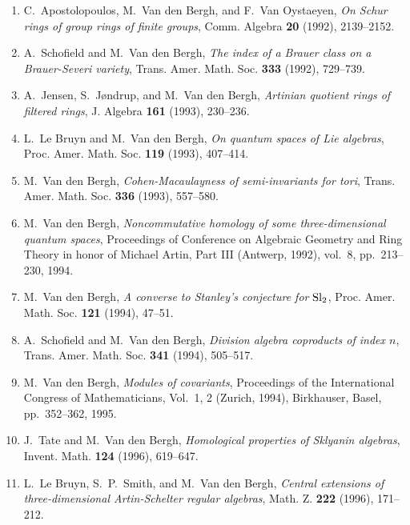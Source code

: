 \begin{enumerate}
\item
C.~Apostolopoulos, M.~Van den Bergh, and F.~Van Oystaeyen, {\em On Schur rings of group rings of finite groups}, Comm. Algebra {\bf 20} (1992), 2139--2152.

\item
A.~Schofield and M.~Van den Bergh, {\em The index of a Brauer class on a Brauer-Severi variety}, Trans. Amer. Math. Soc. {\bf 333} (1992), 729--739.

\item
A.~Jensen, S.~J{\o}ndrup, and M.~Van den Bergh, {\em Artinian quotient rings of filtered rings}, J. Algebra {\bf 161} (1993), 230--236.

\item
L.~Le Bruyn and M.~Van den Bergh, {\em On quantum spaces of Lie algebras}, Proc. Amer. Math. Soc. {\bf 119} (1993), 407--414.

\item
M.~Van den Bergh, {\em Cohen-Macaulayness of semi-invariants for tori}, Trans. Amer. Math. Soc. {\bf 336} (1993), 557--580.

\item
M.~Van den Bergh, {\em Noncommutative homology of some three-dimensional quantum spaces}, Proceedings of Conference on Algebraic Geometry and Ring Theory in honor of Michael Artin, Part III (Antwerp, 1992), vol.~8, pp.~213--230, 1994.

\item
M.~Van den Bergh, {\em A converse to Stanley's conjecture for $\rm Sl\sb 2$}, Proc. Amer. Math. Soc. {\bf 121} (1994), 47--51.

\item
A.~Schofield and M.~Van den Bergh, {\em Division algebra coproducts of index $n$}, Trans. Amer. Math. Soc. {\bf 341} (1994), 505--517.

\item
M.~Van den Bergh, {\em Modules of covariants}, Proceedings of the International Congress of Mathematicians, Vol.\ 1, 2 (Zurich, 1994), Birkhauser, Basel, pp.~352--362, 1995.

\item
J.~Tate and M.~Van den Bergh, {\em Homological properties of Sklyanin algebras}, Invent. Math. {\bf 124} (1996), 619--647.

\item
L.~Le Bruyn, S.~P.~Smith, and M.~Van den Bergh, {\em Central extensions of three-dimensional Artin-Schelter regular algebras}, Math. Z. {\bf 222} (1996), 171--212.


\end{enumerate}
